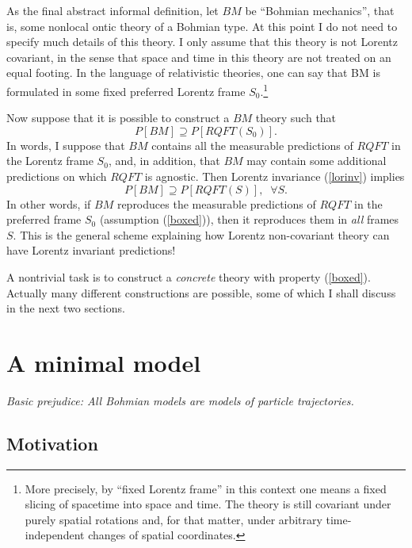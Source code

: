\documentclass[12pt]{article}
\begin{document}
As the final abstract informal definition, let $BM$ be ``Bohmian mechanics'', 
that is, some nonlocal ontic theory of a Bohmian type. 
At this point I do not need to specify much details of this theory.
I only assume that this theory is not Lorentz covariant, in the sense that
space and time in this theory are not treated on an equal footing. 
In the language of relativistic theories, one can say that BM is formulated 
in some fixed preferred Lorentz frame $S_0$.\footnote{More precisely, by ``fixed Lorentz frame''
in this context one means a fixed slicing of spacetime into space and time. The theory is still 
covariant under purely spatial rotations and, for that matter, under arbitrary time-independent
changes of spatial coordinates.}  

Now suppose that it is possible to construct a $BM$ theory such that
\begin{equation}\label{boxed}
 P[BM] \supseteq P[RQFT(S_0)] .
\end{equation}
In words, I suppose that $BM$ contains all the measurable predictions of $RQFT$ in the Lorentz frame $S_0$,
and, in addition, that $BM$ may contain some additional predictions on which $RQFT$ is agnostic. 
Then Lorentz invariance (\ref{lorinv}) implies
\begin{equation}
P[BM] \supseteq P[RQFT(S)], \;\; \forall S .
\end{equation}
In other words, if $BM$ reproduces the measurable predictions of $RQFT$ in the preferred
frame $S_0$ (assumption (\ref{boxed})), then it reproduces them in {\em all} frames $S$.
This is the general scheme explaining how Lorentz non-covariant theory can have Lorentz invariant predictions!

A nontrivial task is to construct a {\em concrete} theory with property (\ref{boxed}).
Actually many different constructions are possible, some of which I shall discuss in the next two sections.


\section{A minimal model}
\label{SECminimal}

\begin{flushright}
{\it Basic prejudice: All Bohmian models are models of particle trajectories.} 
\end{flushright}

\subsection{Motivation}
\end{document}
